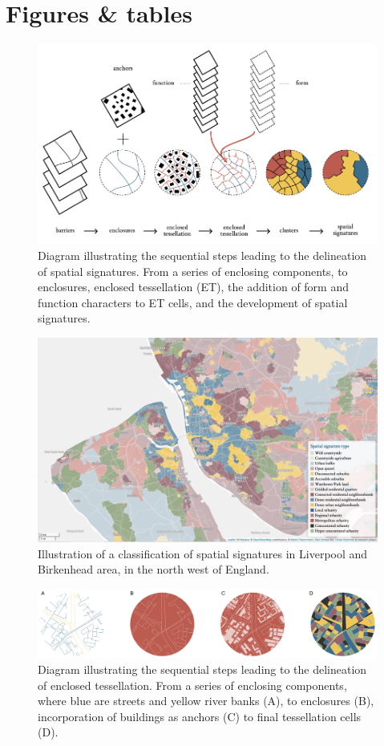 \documentclass[fleqn,10pt]{wlscirep}
\begin{document}
\section*{Figures \& tables}
\begin{figure}[ht]
    \includegraphics[width=\linewidth]{fig/workflow.pdf}
\caption{Diagram illustrating the sequential steps leading to the delineation of
spatial signatures. From a series of enclosing components, to enclosures,
enclosed tessellation (ET), the addition of form and function characters to ET
cells, and the development of spatial signatures.}
\label{fig:workflow}
\end{figure}
\begin{figure}[ht]
    \includegraphics[width=\linewidth]{fig/signatures_map.png}
\caption{Illustration of a classification of spatial signatures in Liverpool and
    Birkenhead area, in the north west of England.}
\label{fig:map}
\end{figure}
\begin{figure}[ht]
    \includegraphics[width=\linewidth]{fig/et_diagram.pdf}
    \caption{Diagram illustrating the sequential steps leading to the delineation of
    enclosed tessellation. From a series of enclosing components, where blue are streets
    and yellow river banks (A), to enclosures (B), incorporation of buildings as anchors
    (C) to final tessellation cells (D).}
    \label{fig:et_diagram}
\end{figure}
\end{document}
